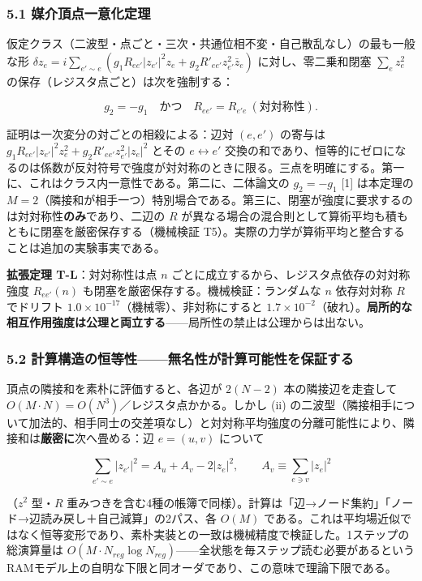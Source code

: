 \documentclass[
  a4paper,
]{ltjsarticle}
\begin{document}
\subsubsection{5.1
媒介頂点一意化定理}\label{ux5a92ux4ecbux9802ux70b9ux4e00ux610fux5316ux5b9aux7406}

仮定クラス（二波型・点ごと・三次・共通位相不変・自己散乱なし）の最も一般な形
\(\delta z_e = i\sum_{e'\sim e}(g_1 R_{ee'}|z_{e'}|^2 z_e + g_2 R'_{ee'} z_{e'}^2\bar z_e)\)
に対し、零二乗和閉塞 \(\sum_e z_e^2\)
の保存（レジスタ点ごと）は次を強制する：

\[g_2 = -g_1 \quad\text{かつ}\quad R_{ee'} = R_{e'e}\ (\text{対対称性}).\]

証明は一次変分の対ごとの相殺による：辺対 \((e,e')\) の寄与は
\(g_1 R_{ee'}|z_{e'}|^2 z_e^2 + g_2 R'_{ee'} z_{e'}^2 |z_e|^2\) とその
\(e\leftrightarrow e'\)
交換の和であり、恒等的にゼロになるのは係数が反対符号で強度が対対称のときに限る。三点を明確にする。第一に、これはクラス内一意性である。第二に、二体論文の
\(g_2=-g_1\) {[}1{]} は本定理の
\(M=2\)（隣接和が相手一つ）特別場合である。第三に、閉塞が強度に要求するのは対対称性\textbf{のみ}であり、二辺の
\(R\)
が異なる場合の混合則として算術平均も積もともに閉塞を厳密保存する（機械検証
T5）。実際の力学が算術平均と整合することは追加の実験事実である。

\textbf{拡張定理 T-L}：対対称性は点 \(n\)
ごとに成立するから、レジスタ点依存の対対称強度 \(R_{ee'}(n)\)
も閉塞を厳密保存する。機械検証：ランダムな \(n\) 依存対対称 \(R\)
でドリフト \(1.0\times10^{-17}\)（機械零）、非対称にすると
\(1.7\times10^{-2}\)（破れ）。\textbf{局所的な相互作用強度は公理と両立する}------局所性の禁止は公理からは出ない。

\subsubsection{5.2
計算構造の恒等性------無名性が計算可能性を保証する}\label{ux8a08ux7b97ux69cbux9020ux306eux6052ux7b49ux6027ux7121ux540dux6027ux304cux8a08ux7b97ux53efux80fdux6027ux3092ux4fddux8a3cux3059ux308b}

頂点の隣接和を素朴に評価すると、各辺が \(2(N-2)\) 本の隣接辺を走査して
\(O(M\cdot N)=O(N^3)\)／レジスタ点かかる。しかし (ii)
の二波型（隣接相手について加法的、相手同士の交差項なし）と対対称平均強度の分離可能性により、隣接和は\textbf{厳密に}次へ畳める：辺
\(e=(u,v)\) について

\[\sum_{e'\sim e} |z_{e'}|^2 = A_u + A_v - 2|z_e|^2, \qquad A_v \equiv \sum_{e\ni v}|z_e|^2\]

（\(z^2\) 型・\(R\)
重みつきを含む4種の帳簿で同様）。計算は「辺→ノード集約」「ノード→辺読み戻し＋自己減算」の2パス、各
\(O(M)\)
である。これは平均場近似ではなく恒等変形であり、素朴実装との一致は機械精度で検証した。1ステップの総演算量は
\(O(M\cdot N_{reg}\log N_{reg})\)------全状態を毎ステップ読む必要があるというRAMモデル上の自明な下限と同オーダであり、この意味で理論下限である。
\end{document}
